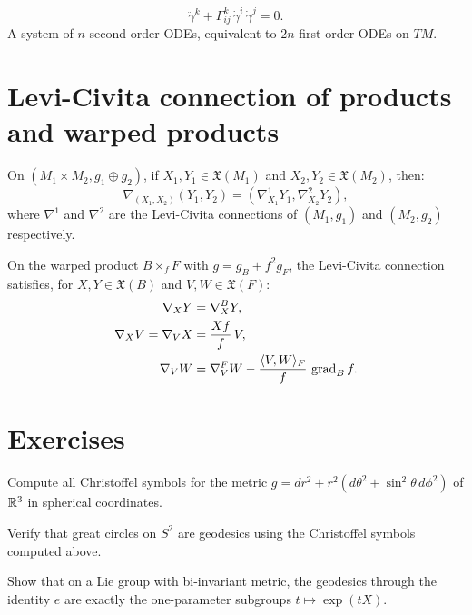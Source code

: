 \begin{keyformulas}[title=\textbf{Geodesic equation}]
\[
    \ddot\gamma^k + \Gamma^k_{ij}\, \dot\gamma^i\, \dot\gamma^j = 0.
\]
A system of $n$ second-order ODEs, equivalent to $2n$ first-order ODEs on $TM$.
\end{keyformulas}

\section{Levi-Civita connection of products and warped products}

\begin{proposition}
On $(M_1 \times M_2, g_1 \oplus g_2)$, if $X_1, Y_1 \in \mathfrak{X}(M_1)$ and
$X_2, Y_2 \in \mathfrak{X}(M_2)$, then:
\[
    \nabla_{(X_1, X_2)}(Y_1, Y_2) = (\nabla^1_{X_1} Y_1, \nabla^2_{X_2} Y_2),
\]
where $\nabla^1$ and $\nabla^2$ are the Levi-Civita connections of $(M_1, g_1)$
and $(M_2, g_2)$ respectively.
\end{proposition}

\begin{proposition}
\label{prop:warped_LC}
On the warped product $B \times_f F$ with $g = g_B + f^2 g_F$, the Levi-Civita
connection satisfies, for $X, Y \in \mathfrak{X}(B)$ and $V, W \in \mathfrak{X}(F)$:
\begin{align*}
    \nabla_X Y &= \nabla^B_X Y, \\
    \nabla_X V = \nabla_V X &= \frac{Xf}{f}\, V, \\
    \nabla_V W &= \nabla^F_V W - \frac{\langle V, W \rangle_F}{f}\, \operatorname{grad}_B f.
\end{align*}
\end{proposition}

\section{Exercises}

\begin{exercise}
Compute all Christoffel symbols for the metric
$g = dr^2 + r^2(d\theta^2 + \sin^2\!\theta\, d\phi^2)$ of $\mathbb{R}^3$ in spherical
coordinates.
\end{exercise}

\begin{exercise}
Verify that great circles on $S^2$ are geodesics using the Christoffel symbols
computed above.
\end{exercise}

\begin{exercise}
Show that on a Lie group with bi-invariant metric, the geodesics through the
identity $e$ are exactly the one-parameter subgroups $t \mapsto \exp(tX)$.
\end{exercise}

